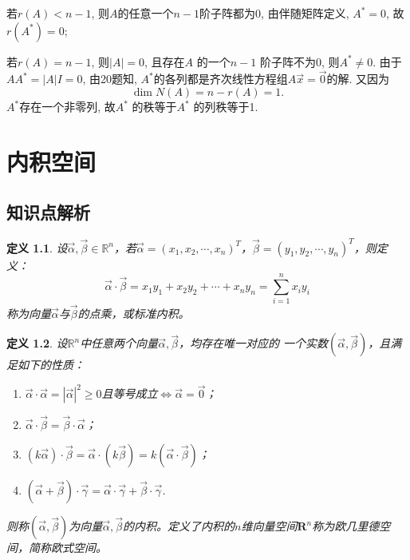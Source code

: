 \documentclass[a4paper]{book}
\newtheorem{Def}{定义}[chapter]
\begin{document}
 若$r(A)<n-1$, 则$A$的任意一个$n-1$阶子阵都为$0$, 由伴随矩阵定义, $A^{*}=0$, 故$r(A^{*})=0$;

 若$r(A)=n-1$, 则$|A|=0$, 且存在$A$ 的一个$n-1$ 阶子阵不为0, 则$A^{*}\not=0$. 由于$AA^{*}=|A|I=0$, 由20题知, $A^{*}$的各列都是齐次线性方程组$A\vec{x}=\vec{0}$的解. 又因为
\begin{displaymath}
\dim N(A)=n-r(A)=1.\end{displaymath}
 $A^{*}$存在一个非零列, 故$A^{*}$ 的秩等于$A^{*}$ 的列秩等于1.


\chapter{内积空间}

\section{知识点解析}
\begin{Def}
设$\vec{\alpha},\vec{\beta}\in\mathbb{R}^n$，若$\vec{\alpha}=(x_1,x_2,\cdots,x_n)^{T}$，$\vec{\beta}=(y_1,y_2,\cdots,y_n)^{T}$，则定义：
\begin{equation*}
\vec{\alpha}\cdot\vec{\beta}=x_1y_1+x_2y_2+\cdots+x_ny_n=\sum_{i=1}^{n}x_iy_i
\end{equation*}
称为向量$\vec{\alpha}$与$\vec{\beta}$的点乘，或标准内积。
\end{Def}

\begin{Def}\label{neiji}
设$\mathbb{R}^{n}$中任意两个向量$\vec{\alpha},\vec{\beta}$，均存在唯一对应的
一个实数$(\vec{\alpha},\vec{\beta})$，且满足如下的性质：
\begin{enumerate}
  \item $\vec{\alpha}\cdot\vec{\alpha}=|\vec{\alpha}|^2\geq0$且等号成立$\Leftrightarrow\vec{\alpha}=\vec{0}$；
  \item $\vec{\alpha}\cdot\vec{\beta}=\vec{\beta}\cdot\vec{\alpha}$；
  \item $(k\vec{\alpha})\cdot\vec{\beta}=\vec{\alpha}\cdot(k\vec{\beta})
        =k(\vec{\alpha}\cdot\vec{\beta})$；
  \item $(\vec{\alpha}+\vec{\beta})\cdot\vec{\gamma}=\vec{\alpha}
        \cdot\vec{\gamma}+\vec{\beta}\cdot\vec{\gamma}$.
\end{enumerate}
则称$(\vec{\alpha},\vec{\beta})$为向量$\vec{\alpha},\vec{\beta}$的内积。定义了内积的$n$维向量空间$\mathbf{R}^n$称为欧几里德空间，简称欧式空间。
\end{Def}
\end{document}
